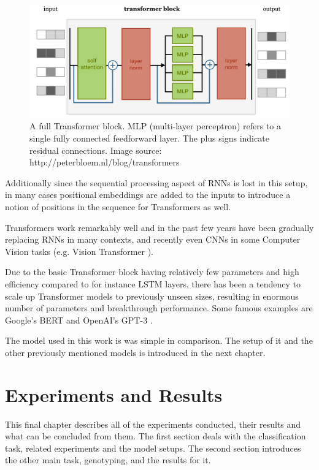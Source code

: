 \documentclass[bsc,frontabs,singlespacing,parskip,deptreport]{infthesis}
\begin{document}
\begin{figure}
\centering
\includegraphics[width = 5in]{transformer-block}
\setlength{\belowcaptionskip}{0pt}
\caption{A full Transformer block. MLP (multi-layer perceptron) refers to a single fully connected feedforward layer. The plus signs indicate residual connections. Image source: http://peterbloem.nl/blog/transformers}
\label{gru}
\vskip -5mm
\end{figure}

Additionally since the sequential processing aspect of RNNs is lost in this setup, in many cases positional embeddings are added to the inputs to introduce a notion of positions in the sequence for Transformers as well.

Transformers work remarkably well and in the past few years have been gradually replacing RNNs in many contexts, and recently even CNNs in some Computer Vision tasks (e.g. Vision Transformer \cite{vision-transformer}). 

Due to the basic Transformer block having relatively few parameters and high efficiency compared to for instance LSTM layers, there has been a tendency to scale up Transformer models to previously unseen sizes, resulting in enormous number of parameters and breakthrough performance. Some famous examples are Google's BERT \cite{bert} and OpenAI's GPT-3 \cite{gpt-3}.

The model used in this work is was simple in comparison. The setup of it and the other previously mentioned models is introduced in the next chapter.




\chapter{Experiments and Results}

This final chapter describes all of the experiments conducted, their results and what can be concluded from them. The first section deals with the classification task, related experiments and the model setups. The second section introduces the other main task, genotyping, and the results for it.
\end{document}

